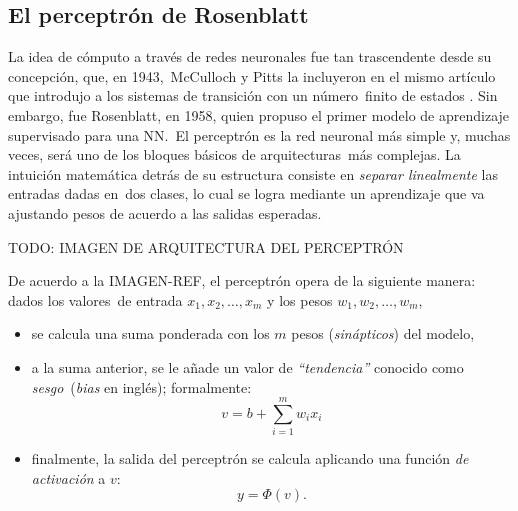 \subsection{El perceptrón de Rosenblatt}

\noindent
La idea de cómputo a través de redes neuronales fue tan trascendente desde su concepción, que, en 1943,\
McCulloch y Pitts la incluyeron en el mismo artículo que introdujo a los sistemas de transición con un número\
finito de estados \cite{mcculloch:pitts}. Sin embargo, fue Rosenblatt, en 1958, quien propuso el primer modelo de aprendizaje supervisado para una NN.\
El perceptrón es la red neuronal más simple y, muchas veces, será uno de los bloques básicos de arquitecturas\
más complejas. La intuición matemática detrás de su estructura consiste en \emph{separar linealmente} las entradas dadas en\
dos clases, lo cual se logra mediante un aprendizaje que va ajustando pesos de acuerdo a las salidas esperadas.\par

TODO: IMAGEN DE ARQUITECTURA DEL PERCEPTRÓN

De acuerdo a la IMAGEN-REF, el perceptrón opera de la siguiente manera: dados los valores\
de entrada $x_1, x_2,\ldots, x_m$ y los pesos $w_1, w_2,\ldots, w_m$,
\begin{itemize}
\item se calcula una suma ponderada con los $m$ pesos (\emph{sinápticos}) del modelo,
\item a la suma anterior, se le añade un valor de \emph{``tendencia''} conocido como \emph{sesgo}\
  (\emph{bias} en inglés); formalmente:
  \begin{equation}
    v = b + \sum_{i=1}^{m} w_ix_i
  \end{equation}
\item finalmente, la salida del perceptrón se calcula aplicando una función \emph{de activación} a $v$:
    \begin{equation}
      y = \Phi(v).
    \end{equation}
\end{itemize}

